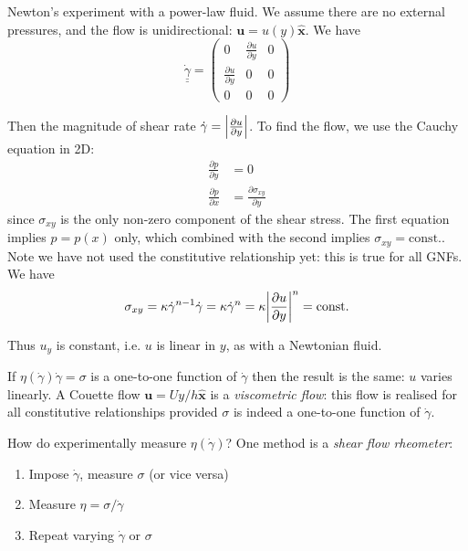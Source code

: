 \documentclass{jknotes}
\newcommand{\dunder}[1]{\underline{\underline{#1}}}
\newcommand{\srate}{\dot{\gamma}}
\begin{document}
\begin{eg}
	Newton's experiment with a power-law fluid. We assume there are no
	external pressures, and the flow is unidirectional: $\bm{u} =
	u(y)\hat{\bm{x}}$. We have
	\begin{equation}
		\dunder{\srate} = \begin{pmatrix} 0 & \frac{\partial u}{\partial y} &
			0 \\ \frac{\partial  u}{\partial y} & 0 & 0 \\ 0 & 0 & 0
		\end{pmatrix}
	\end{equation}

	Then the magnitude of shear rate $\srate = \abs{\frac{\partial u}{\partial
	y}}$. To find the flow, we use the Cauchy equation in 2D:
	\begin{equation}
		\begin{aligned}
			\frac{\partial p}{\partial y} &= 0 \\
			\frac{\partial p}{\partial x} &= \frac{\partial \sigma_{xy}}{\partial y} 
		\end{aligned}
	\end{equation}
	since $\sigma_{xy}$ is the only non-zero component of the shear stress.
	The first equation implies $p = p(x)$ only, which combined with the second
	implies $\sigma_{xy} = \text{const.}$. Note we have not used the
	constitutive relationship yet: this is true for all GNFs. We have
	\begin{equation}
		\sigma_{xy} = \kappa \srate^{n-1} \srate = \kappa \srate^n = \kappa
		\abs{\frac{\partial u}{\partial y}}^n = \text{const.}
	\end{equation}

	Thus $u_y$ is constant, i.e. $u$ is linear in $y$, as with a Newtonian
	fluid. 
\end{eg}

If $\eta(\srate)\srate = \sigma$ is a one-to-one function of $\srate$ then the
result is the same: $u$ varies linearly. A Couette flow $\bm{u} = Uy/h
\hat{\bm{x}}$ is a \emph{viscometric flow}: this flow is realised for all
constitutive relationships provided $\sigma$ is indeed a one-to-one function
of $\srate$.

How do experimentally measure $\eta(\srate)$? One method is a \emph{shear flow
rheometer}:
\begin{enumerate}
	\item Impose $\srate$, measure $\sigma$ (or vice versa)
	\item Measure $\eta = \sigma/\srate$
	\item Repeat varying $\srate$ or $\sigma$
\end{enumerate}
\end{document}
